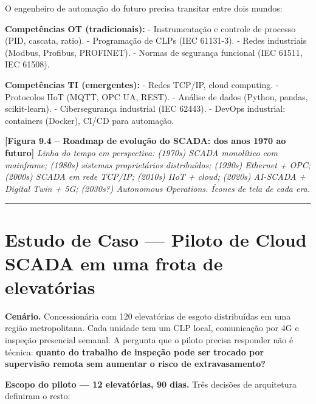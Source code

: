 O engenheiro de automação do futuro precisa transitar entre dois mundos:

\textbf{Competências OT (tradicionais):}
- Instrumentação e controle de processo (PID, cascata, ratio).
- Programação de CLPs (IEC 61131-3).
- Redes industriais (Modbus, Profibus, PROFINET).
- Normas de segurança funcional (IEC 61511, IEC 61508).

\textbf{Competências TI (emergentes):}
- Redes TCP/IP, cloud computing.
- Protocolos IIoT (MQTT, OPC UA, REST).
- Análise de dados (Python, pandas, scikit-learn).
- Cibersegurança industrial (IEC 62443).
- DevOps industrial: containers (Docker), CI/CD para automação.

\begin{caixafigura}

\textbf{{[}Figura 9.4 -- Roadmap de evolução do SCADA: dos anos 1970 ao futuro{]}}
\emph{Linha do tempo em perspectiva: (1970s) SCADA monolítico com mainframe; (1980s) sistemas proprietários distribuídos; (1990s) Ethernet + OPC; (2000s) SCADA em rede TCP/IP; (2010s) IIoT + cloud; (2020s) AI-SCADA + Digital Twin + 5G; (2030s?) Autonomous Operations. Ícones de tela de cada era.}

\end{caixafigura}

\begin{center}\rule{0.5\linewidth}{0.5pt}\end{center}

\section{\texorpdfstring{Estudo de Caso --- Piloto de Cloud SCADA em uma frota de elevatórias}{Estudo de Caso  Piloto de Cloud SCADA em uma frota de elevatórias}}\label{estudo-de-caso-piloto-de-cloud-scada-em-uma-frota-de-elevatuxf3rias}

\textbf{Cenário.} Concessionária com 120 elevatórias de esgoto distribuídas em uma região
metropolitana. Cada unidade tem um CLP local, comunicação por 4G e inspeção presencial semanal. A
pergunta que o piloto precisa responder não é técnica: \textbf{quanto do trabalho de inspeção pode ser
trocado por supervisão remota sem aumentar o risco de extravasamento?}

\textbf{Escopo do piloto --- 12 elevatórias, 90 dias.} Três decisões de arquitetura definiram o resto:

